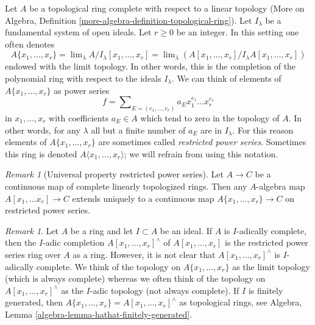 \documentclass{stacks-project}
\newenvironment{reference}{\comment}{\endcomment}
\theoremstyle{plain}
\theoremstyle{definition}
\theoremstyle{remark}
\newtheorem{remark}[subsection]{Remark}
\numberwithin{equation}{subsection}
\def\lim{\mathop{\mathrm{lim}}\nolimits}
\begin{document}
\noindent
Let $A$ be a topological ring complete with respect to a linear
topology (More on Algebra, Definition
\ref{more-algebra-definition-topological-ring}).
Let $I_\lambda$ be a fundamental system of open ideals.
Let $r \geq 0$ be an integer. In this setting one often
denotes
$$
A\{x_1, \ldots, x_r\} =
\lim_\lambda A/I_\lambda[x_1, \ldots, x_r] =
\lim_\lambda (A[x_1, \ldots, x_r]/I_\lambda A[x_1, \ldots, x_r])
$$
endowed with the limit topology. In other words, this is
the completion of the polynomial ring with respect to the
ideals $I_\lambda$. We can think of elements of $A\{x_1, \ldots, x_r\}$ as
power series
$$
f = \sum\nolimits_{E = (e_1, \ldots, e_r)} a_E x_1^{e_1} \ldots x_r^{e_r}
$$
in $x_1, \ldots, x_r$ with coefficients $a_E \in A$ which tend
to zero in the topology of $A$. In other words, for any $\lambda$
all but a finite number of $a_E$ are in $I_\lambda$.
For this reason elements of $A\{x_1, \ldots, x_r\}$ are sometimes
called {\it restricted power series}.
Sometimes this ring is denoted $A\langle x_1, \ldots, x_r\rangle$;
we will refrain from using this notation.

\begin{remark}[Universal property restricted power series]
\label{remark-universal-property}
\begin{reference}
\cite[Chapter 0, 7.5.3]{EGA}
\end{reference}
Let $A \to C$ be a continuous map of complete linearly topologized rings.
Then any $A$-algebra map $A[x_1, \ldots x_r] \to C$ extends uniquely to a
continuous map $A\{x_1, \ldots, x_r\} \to C$ on restricted power series.
\end{remark}

\begin{remark}
\label{remark-I-adic-completion-and-restricted-power-series}
Let $A$ be a ring and let $I \subset A$ be an ideal. If $A$ is $I$-adically
complete, then the $I$-adic completion $A[x_1, \ldots, x_r]^\wedge$ of
$A[x_1, \ldots, x_r]$ is the restricted power series ring over $A$ as a
ring. However, it is not clear that $A[x_1, \ldots, x_r]^\wedge$ is
$I$-adically complete. We think of the topology on $A\{x_1, \ldots, x_r\}$
as the limit topology (which is always complete) whereas we often think of
the topology on $A[x_1, \ldots, x_r]^\wedge$ as the $I$-adic topology
(not always complete). If $I$ is finitely generated, then
$A\{x_1, \ldots, x_r\} = A[x_1, \ldots, x_r]^\wedge$ as topological
rings, see Algebra, Lemma \ref{algebra-lemma-hathat-finitely-generated}.
\end{remark}
\end{document}
